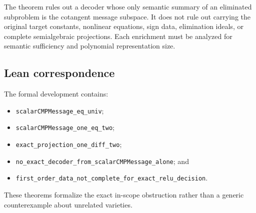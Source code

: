 The theorem rules out a decoder whose only semantic summary of an eliminated
subproblem is the cotangent message subspace.  It does not rule out carrying
the original target constants, nonlinear equations, sign data, elimination
ideals, or complete semialgebraic projections.  Each enrichment must be
analyzed for semantic sufficiency and polynomial representation size.

\subsection{Lean correspondence}

The formal development contains:
\begin{itemize}
  \item \texttt{scalarCMPMessage\_eq\_univ};
  \item \texttt{scalarCMPMessage\_one\_eq\_two};
  \item \texttt{exact\_projection\_one\_diff\_two};
  \item \texttt{no\_exact\_decoder\_from\_scalarCMPMessage\_alone}; and
  \item \texttt{first\_order\_data\_not\_complete\_for\_exact\_relu\_decision}.
\end{itemize}
These theorems formalize the exact in-scope obstruction rather than a generic
counterexample about unrelated varieties.
